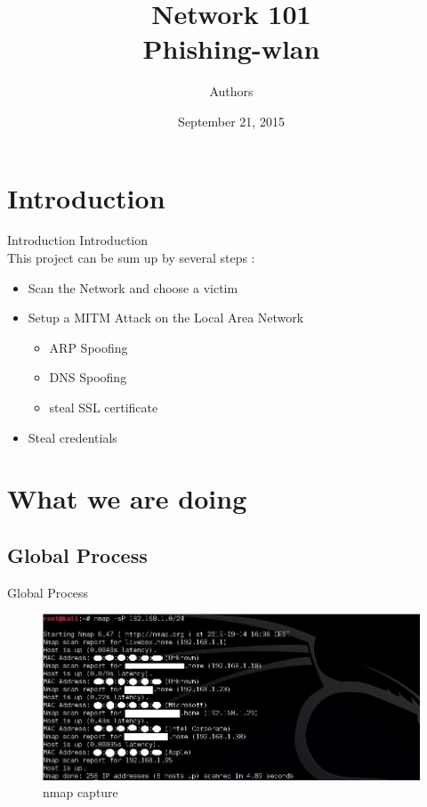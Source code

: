 \documentclass{beamer}
\title[Phishing-Wlan]{Network 101\\Phishing-wlan}
\author{Authors}
\institute{Institute}
\date{September 21, 2015}
\begin{document}
\begin{frame}
	\titlepage
\end{frame}


\section{Introduction}
\begin{frame}{Introduction}
	Introduction\\
	This project can be sum up by several steps :\\
	\begin{itemize}
		\pause \item Scan the Network and choose a victim\\
		\pause \item Setup a MITM Attack on the Local Area Network\\
			\begin{itemize}
    			\pause \item ARP Spoofing\\
    			\pause \item DNS Spoofing\\
    			\pause \item steal SSL certificate\\
    		\end{itemize}
		\pause \item Steal credentials\\
	\end{itemize}
\end{frame}

\section{What we are doing}
\subsection{Global Process}
\begin{frame}{Global Process}
	\begin{figure}[!h]
		\centering
		\includegraphics[scale=0.45]{../images/captureNMAP.jpg}
		\caption{nmap capture}
		\label{nmap_capture}
	\end{figure}
\end{frame}
\end{document}
